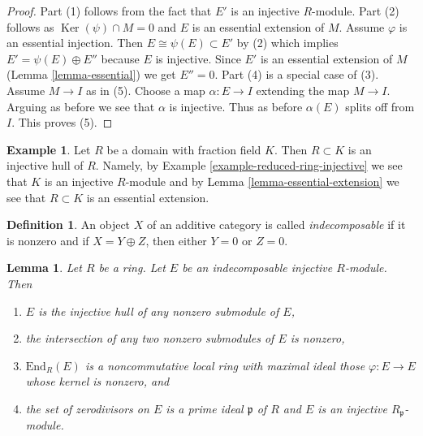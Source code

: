 \documentclass{stacks-project}
\theoremstyle{plain}
\newtheorem{lemma}[subsection]{Lemma}
\theoremstyle{definition}
\newtheorem{definition}[subsection]{Definition}
\newtheorem{example}[subsection]{Example}
\theoremstyle{remark}
\numberwithin{equation}{subsection}
\def\Ker{\mathop{\mathrm{Ker}}}
\begin{document}
\begin{proof}
Part (1) follows from the fact that $E'$ is an injective $R$-module.
Part (2) follows as $\Ker(\psi) \cap M = 0$
and $E$ is an essential extension of $M$.
Assume $\varphi$ is an essential injection. Then
$E \cong \psi(E) \subset E'$ by (2) which implies
$E' = \psi(E) \oplus E''$ because $E$ is injective.
Since $E'$ is an essential extension of
$M$ (Lemma \ref{lemma-essential}) we get $E'' = 0$.
Part (4) is a special case of (3).
Assume $M \to I$ as in (5).
Choose a map $\alpha : E \to I$ extending the map $M \to I$.
Arguing as before we see that $\alpha$ is injective.
Thus as before $\alpha(E)$ splits off from $I$.
This proves (5).
\end{proof}

\begin{example}
\label{example-injective-hull-domain}
Let $R$ be a domain with fraction field $K$. Then $R \subset K$ is an
injective hull of $R$. Namely, by
Example \ref{example-reduced-ring-injective} we see that $K$ is an injective
$R$-module and by Lemma \ref{lemma-essential-extension} we see that
$R \subset K$ is an essential extension.
\end{example}

\begin{definition}
\label{definition-indecomposable}
An object $X$ of an additive category is called {\it indecomposable}
if it is nonzero and if $X = Y \oplus Z$, then either $Y = 0$ or $Z = 0$.
\end{definition}

\begin{lemma}
\label{lemma-indecomposable-injective}
Let $R$ be a ring. Let $E$ be an indecomposable injective $R$-module.
Then
\begin{enumerate}
\item $E$ is the injective hull of any nonzero submodule of $E$,
\item the intersection of any two nonzero submodules of $E$ is nonzero,
\item $\text{End}_R(E)$ is a noncommutative local ring with maximal
ideal those $\varphi : E \to E$ whose kernel is nonzero, and
\item the set of zerodivisors on $E$ is a prime ideal $\mathfrak p$ of $R$
and $E$ is an injective $R_\mathfrak p$-module.
\end{enumerate}
\end{lemma}
\end{document}
